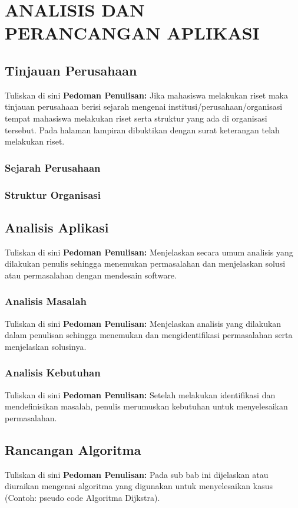 \chapter{ANALISIS DAN PERANCANGAN APLIKASI}

\section{Tinjauan Perusahaan}


Tuliskan di sini \textbf{Pedoman Penulisan:} Jika mahasiswa melakukan riset maka tinjauan perusahaan berisi sejarah mengenai institusi/perusahaan/organisasi tempat mahasiswa melakukan riset serta struktur yang ada di organisasi tersebut. Pada halaman lampiran dibuktikan dengan surat keterangan telah melakukan riset.


\subsection{Sejarah Perusahaan}
\subsection{Struktur Organisasi}

\section{Analisis Aplikasi}


Tuliskan di sini \textbf{Pedoman Penulisan:} Menjelaskan secara umum analisis yang dilakukan penulis sehingga menemukan permasalahan dan menjelaskan solusi atau permasalahan dengan mendesain software.


\subsection{Analisis Masalah}


Tuliskan di sini \textbf{Pedoman Penulisan:} Menjelaskan analisis yang dilakukan dalam penulisan sehingga menemukan dan mengidentifikasi permasalahan serta menjelaskan solusinya.


\subsection{Analisis Kebutuhan}


Tuliskan di sini \textbf{Pedoman Penulisan:} Setelah melakukan identifikasi dan mendefinisikan masalah, penulis merumuskan kebutuhan untuk menyelesaikan permasalahan.



\section{Rancangan Algoritma}


Tuliskan di sini \textbf{Pedoman Penulisan:} Pada sub bab ini dijelaskan atau diuraikan mengenai algoritma yang digunakan untuk menyelesaikan kasus (Contoh: pseudo code Algoritma Dijkstra).


